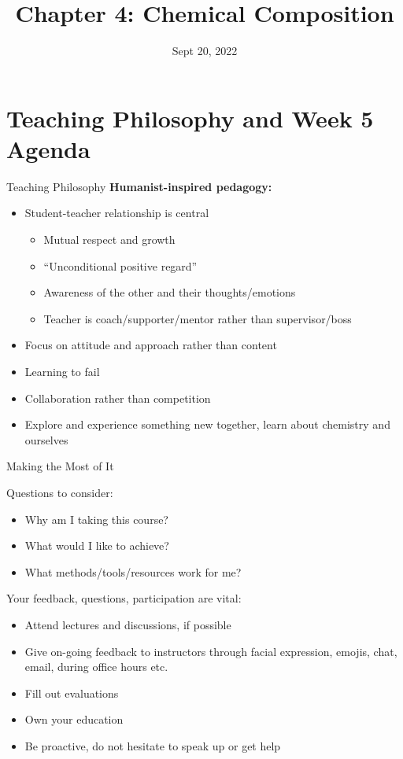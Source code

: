 \documentclass[11pt]{beamer}
\title{Chapter 4: Chemical Composition}
\institute{Chemistry Department, Cypress College}
\date{Sept 20, 2022}
\begin{document}
\begin{frame}
  \titlepage
\end{frame}

\section{Teaching Philosophy and Week 5 Agenda}

\begin{frame}{Teaching Philosophy}
  \textbf{Humanist-inspired pedagogy:}
  \begin{itemize}
  \item Student-teacher relationship is central
    \begin{itemize}
    \item Mutual respect and growth
    \item ``Unconditional positive regard''
    \item Awareness of the other and their thoughts/emotions
    \item Teacher is coach/supporter/mentor rather than supervisor/boss
    \end{itemize}
  \item Focus on attitude and approach rather than content
  \item Learning to fail
  \item Collaboration rather than competition
  \item Explore and experience something new together, learn about
    chemistry and ourselves
  \end{itemize}
\end{frame}

\begin{frame}{Making the Most of It}

  Questions to consider:
  \begin{itemize}
  \item Why am I taking this course?
  \item What would I like to achieve?
  \item What methods/tools/resources work for me?
  \end{itemize}

  Your feedback, questions, participation are vital:
  \begin{itemize}
  \item Attend lectures and discussions, if possible
  \item Give on-going feedback to instructors through facial expression,
    emojis, chat, email, during office hours etc.
  \item Fill out evaluations
  \item Own your education
  \item Be proactive, do not hesitate to speak up or get help
  \end{itemize}

\end{frame}
\end{document}

